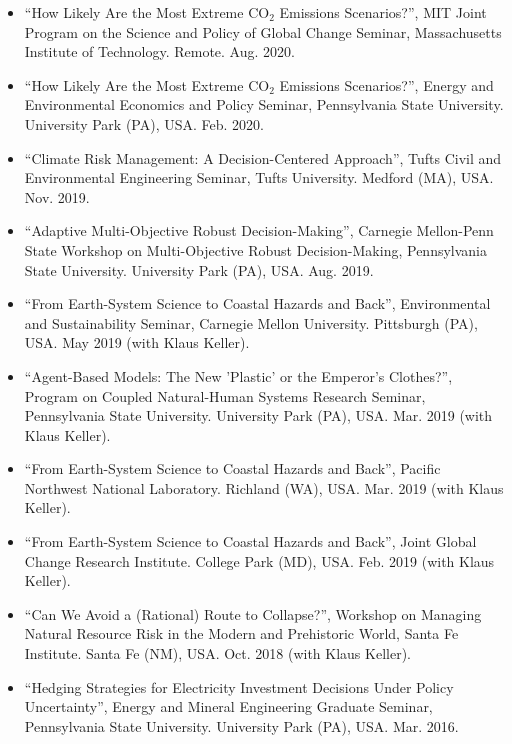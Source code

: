 \documentclass[11pt,article,oneside]{memoir}
\begin{document}
\begin{itemize}[label={}]

\item \enquote{How Likely Are the Most Extreme CO$_2$ Emissions Scenarios?}, MIT Joint Program on the Science and Policy of Global Change Seminar,  Massachusetts Institute of Technology. Remote. Aug. 2020.

\item \enquote{How Likely Are the Most Extreme CO$_2$ Emissions Scenarios?}, Energy and Environmental Economics and Policy Seminar,  Pennsylvania State University. University Park (PA), USA. Feb. 2020.

\item \enquote{Climate Risk Management: A Decision-Centered Approach}, Tufts Civil and Environmental Engineering Seminar,  Tufts University. Medford (MA), USA. Nov. 2019.

\item \enquote{Adaptive Multi-Objective Robust Decision-Making}, Carnegie Mellon-Penn State Workshop on Multi-Objective Robust Decision-Making,  Pennsylvania State University. University Park (PA), USA. Aug. 2019.

\item \enquote{From Earth-System Science to Coastal Hazards and Back}, Environmental and Sustainability Seminar,  Carnegie Mellon University. Pittsburgh (PA), USA. May 2019 (with Klaus Keller).

\item \enquote{Agent-Based Models: The New 'Plastic' or the Emperor's Clothes?}, Program on Coupled Natural-Human Systems Research Seminar,  Pennsylvania State University. University Park (PA), USA. Mar. 2019 (with Klaus Keller).

\item \enquote{From Earth-System Science to Coastal Hazards and Back},  Pacific Northwest National Laboratory. Richland (WA), USA. Mar. 2019 (with Klaus Keller).

\item \enquote{From Earth-System Science to Coastal Hazards and Back},  Joint Global Change Research Institute. College Park (MD), USA. Feb. 2019 (with Klaus Keller).

\item \enquote{Can We Avoid a (Rational) Route to Collapse?}, Workshop on Managing Natural Resource Risk in the Modern and Prehistoric World,  Santa Fe Institute. Santa Fe (NM), USA. Oct. 2018 (with Klaus Keller).

\item \enquote{Hedging Strategies for Electricity Investment Decisions Under Policy Uncertainty}, Energy and Mineral Engineering Graduate Seminar,  Pennsylvania State University. University Park (PA), USA. Mar. 2016.

\end{itemize}
\end{document}
